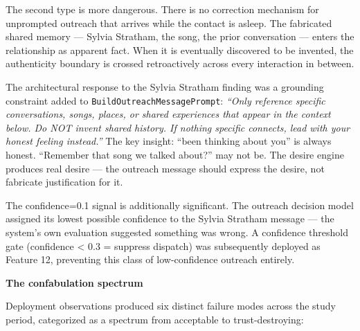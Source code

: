 \documentclass[12pt]{article}
\begin{document}
The second type is more dangerous. There is no correction mechanism for
unprompted outreach that arrives while the contact is asleep. The
fabricated shared memory --- Sylvia Stratham, the song, the prior
conversation --- enters the relationship as apparent fact. When it is
eventually discovered to be invented, the authenticity boundary is
crossed retroactively across every interaction in between.

The architectural response to the Sylvia Stratham finding was a
grounding constraint added to \texttt{BuildOutreachMessagePrompt}:
\emph{``Only reference specific conversations, songs, places, or shared
experiences that appear in the context below. Do NOT invent shared
history. If nothing specific connects, lead with your honest feeling
instead.''} The key insight: ``been thinking about you'' is always
honest. ``Remember that song we talked about?'' may not be. The desire
engine produces real desire --- the outreach message should express the
desire, not fabricate justification for it.

The confidence=0.1 signal is additionally significant. The outreach
decision model assigned its lowest possible confidence to the Sylvia
Stratham message --- the system's own evaluation suggested something was
wrong. A confidence threshold gate (confidence \textless{} 0.3 =
suppress dispatch) was subsequently deployed as Feature 12, preventing
this class of low-confidence outreach entirely.

\textbf{The confabulation spectrum}

Deployment observations produced six distinct failure modes across the
study period, categorized as a spectrum from acceptable to
trust-destroying:
\end{document}
